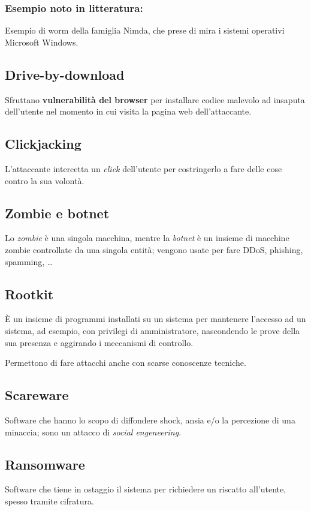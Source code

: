 \documentclass{report}
\begin{document}
\subsubsection{Esempio noto in litteratura:}
Esempio di worm della famiglia Nimda, che prese di mira i sistemi operativi Microsoft Windows.

\subsection{Drive-by-download}
Sfruttano \textbf{vulnerabilità del browser} per installare codice malevolo ad insaputa dell'utente 
nel momento in cui visita la pagina web dell'attaccante. 

\subsection{Clickjacking}
L'attaccante intercetta un \textit{click} dell'utente per costringerlo a fare delle cose 
contro la sua volontà.

\subsection{Zombie e botnet}
Lo \textit{zombie} è una singola macchina, mentre la \textit{botnet} è un insieme di macchine 
zombie controllate da una singola entità; vengono usate per fare DDoS, phishing, spamming, \dots

\subsection{Rootkit}
È un insieme di programmi installati su un sistema per mantenere l'accesso ad un sistema, ad 
esempio, con privilegi di amministratore, nascondendo le prove della sua presenza e aggirando 
i meccanismi di controllo.

\noindent Permettono di fare attacchi anche con scarse conoscenze tecniche.

\subsection{Scareware}
Software che hanno lo scopo di diffondere shock, ansia e/o la percezione di una minaccia; sono 
un attacco di \textit{social engeneering}.

\subsection{Ransomware}
Software che tiene in ostaggio il sistema per richiedere un riscatto all'utente, spesso tramite
cifratura.
\end{document}
